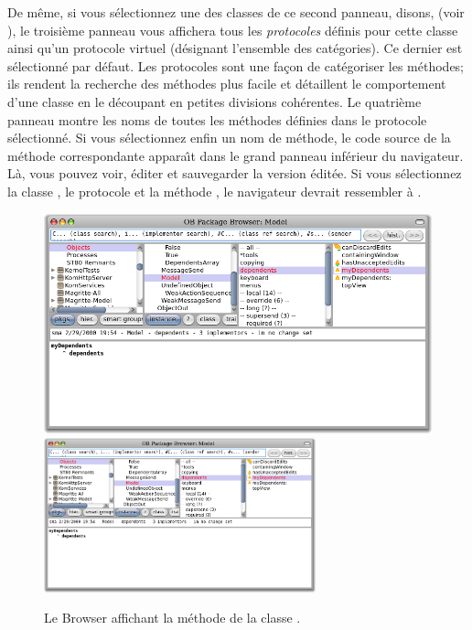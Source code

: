 \documentclass[a4paper,10pt,twoside]{book}
\begin{document}
De m\^eme, si vous s\'electionnez une des classes de ce second panneau,
disons,  (voir  ), le troisi\`eme
panneau vous affichera tous les \emph{protocoles} d\'efinis pour cette
classe ainsi qu'un protocole virtuel  (d\'esignant l'ensemble des cat\'egories). Ce dernier est s\'electionn\'e par d\'efaut. 
Les protocoles sont une fa\c{c}on de cat\'egoriser les m\'ethodes;
ils rendent la recherche des m\'ethodes plus facile et d\'etaillent
le comportement d'une classe en le d\'ecoupant en petites divisions 
coh\'erentes.
Le quatri\`eme panneau montre les noms de toutes les m\'ethodes d\'efinies dans le protocole s\'electionn\'e.
Si vous s\'electionnez enfin un nom de m\'ethode, le code source de la 
m\'ethode correspondante appara\^{\i}t dans le grand panneau inf\'erieur
du navigateur. L\`a, vous pouvez voir, \'editer et sauvegarder la version \'edit\'ee.
Si vous s\'electionnez la classe
, le protocole  et la m\'ethode , le navigateur devrait ressembler \`a .

\begin{figure}[htbp]
   \centering
   \ifluluelse
	   {\includegraphics[width=\textwidth]{SystemBrowserMyDependents}}
	   {\includegraphics[width=0.7\textwidth]{SystemBrowserMyDependents}}
   \caption{Le Browser affichant la m\'ethode  de la classe .
   }
\end{figure}
\end{document}
